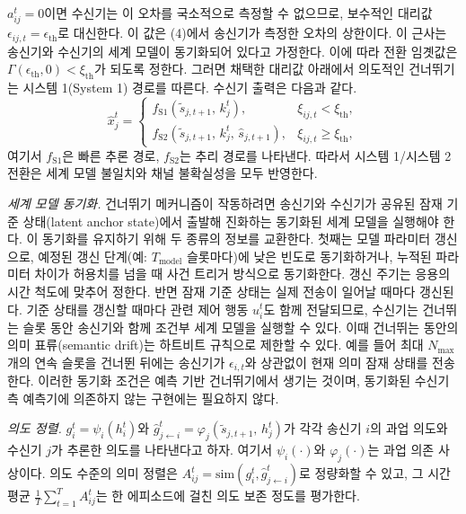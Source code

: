 $a_{ij}^t = 0$이면 수신기는 이 오차를 국소적으로 측정할 수 없으므로, 보수적인 대리값 $\epsilon_{ij,t} = \epsilon_{\mathrm{th}}$로 대신한다.
이 값은 (4)에서 송신기가 측정한 오차의 상한이다.
이 근사는 송신기와 수신기의 세계 모델이 동기화되어 있다고 가정한다.
이에 따라 전환 임곗값은 $\Gamma(\epsilon_{\mathrm{th}}, 0) < \xi_{\mathrm{th}}$가 되도록 정한다.
그러면 채택한 대리값 아래에서 의도적인 건너뛰기는 시스템 1(System 1) 경로를 따른다.
수신기 출력은 다음과 같다.
\begin{equation}
\hat{x}_j^t =
\begin{cases}
f_{\mathrm{S1}}(\tilde{s}_{j,t+1},\, k_j^t), & \xi_{ij,t} < \xi_{\mathrm{th}},\\
f_{\mathrm{S2}}(\tilde{s}_{j,t+1},\, k_j^t,\, \hat{s}_{j,t+1}), & \xi_{ij,t} \ge \xi_{\mathrm{th}},
\end{cases} \tag{6}
\end{equation}
여기서 $f_{\mathrm{S1}}$은 빠른 추론 경로, $f_{\mathrm{S2}}$는 추리 경로를 나타낸다.
따라서 시스템 1/시스템 2 전환은 세계 모델 불일치와 채널 불확실성을 모두 반영한다.

\textit{세계 모델 동기화.}
건너뛰기 메커니즘이 작동하려면 송신기와 수신기가 공유된 잠재 기준 상태(latent anchor state)에서 출발해 진화하는 동기화된 세계 모델을 실행해야 한다.
이 동기화를 유지하기 위해 두 종류의 정보를 교환한다.
첫째는 모델 파라미터 갱신으로, 예정된 갱신 단계(예: $T_{\mathrm{model}}$ 슬롯마다)에 낮은 빈도로 동기화하거나, 누적된 파라미터 차이가 허용치를 넘을 때 사건 트리거 방식으로 동기화한다.
갱신 주기는 응용의 시간 척도에 맞추어 정한다.
반면 잠재 기준 상태는 실제 전송이 일어날 때마다 갱신된다.
기준 상태를 갱신할 때마다 관련 제어 행동 $u_i^t$도 함께 전달되므로, 수신기는 건너뛰는 슬롯 동안 송신기와 함께 조건부 세계 모델을 실행할 수 있다.
이때 건너뛰는 동안의 의미 표류(semantic drift)는 하트비트 규칙으로 제한할 수 있다.
예를 들어 최대 $N_{\max}$개의 연속 슬롯을 건너뛴 뒤에는 송신기가 $\epsilon_{i,t}$와 상관없이 현재 의미 잠재 상태를 전송한다.
이러한 동기화 조건은 예측 기반 건너뛰기에서 생기는 것이며, 동기화된 수신기 측 예측기에 의존하지 않는 구현에는 필요하지 않다.

\textit{의도 정렬.}
$g_i^t = \psi_i(h_i^t)$와 $\hat{g}_{j\leftarrow i}^t = \varphi_j(\tilde{s}_{j,t+1},\, h_j^t)$가 각각 송신기 $i$의 과업 의도와 수신기 $j$가 추론한 의도를 나타낸다고 하자.
여기서 $\psi_i(\cdot)$와 $\varphi_j(\cdot)$는 과업 의존 사상이다.
의도 수준의 의미 정렬은 $A_{ij}^t = \mathrm{sim}(g_i^t, \hat{g}_{j\leftarrow i}^t)$로 정량화할 수 있고, 그 시간 평균 $\frac{1}{T}\sum_{t=1}^{T} A_{ij}^t$는 한 에피소드에 걸친 의도 보존 정도를 평가한다.

